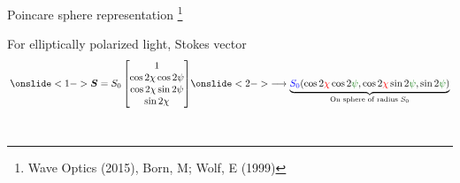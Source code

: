 \documentclass[12pt, dvipsnames]{beamer}
\numberwithin{equation}{section}
\newcommand\blfootnote[1]{%
	\begingroup
	\renewcommand\thefootnote{}\footnote{#1}%
	\addtocounter{footnote}{-1}%
	\endgroup
}
\begin{document}
\begin{frame}[t]{Poincare sphere representation}\blfootnote{Wave Optics (2015), Born, M;  Wolf, E (1999)}
	\vspace{-10pt}
	For elliptically polarized light, Stokes vector
	\begin{align*}
		\onslide<1->{\boldsymbol{S}=
		S_0
		\begin{bmatrix}
			1\\
			\cos 2\chi \cos 2\psi\\
			\cos 2\chi \sin 2\psi\\
			\sin 2\chi
		\end{bmatrix}}\onslide<2->{\longrightarrow
		\underbrace{{\color{blue}S_0}(\cos 2{\color{red}\chi} \cos 2{\color{green!45!black}\psi}, \cos 2{\color{red}\chi} \sin 2{\color{green!45!black}\psi}, \sin 2{\color{red}{\color{green!45!black}\psi}})}_{\text{On sphere of radius $S_0$}}}
	\end{align*}
\\
\vspace{7pt}
\end{frame}
\end{document}
